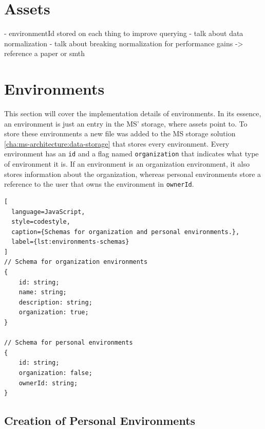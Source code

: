 %

\section{Assets}

- environmentId stored on each thing to improve querying
- talk about data normalization
- talk about breaking normalization for performance gains -> reference a paper or smth

\section{Environments}


This section will cover the implementation details of environments.
In its essence, an environment is just an entry in the MS' storage, where assets point to.
To store these environments a new file was added to the MS storage solution
\ref{cha:ms-architecture:data-storage} that stores every environment.
Every environment has an \lstinline{id} and a flag named \lstinline{organization} that
indicates what type of environment it is.
If an environment is an organization environment, it also stores information about the
organization,
whereas personal environments store a reference to the user that owns the environment in
\lstinline{ownerId}.

\begin{lstlisting}[
  language=JavaScript,
  style=codestyle,
  caption={Schemas for organization and personal environments.},
  label={lst:environments-schemas}
]
// Schema for organization environments
{
    id: string;
    name: string;
    description: string;
    organization: true;
}

// Schema for personal environments
{
    id: string;
    organization: false;
    ownerId: string;
}
\end{lstlisting}

\subsection{Creation of Personal Environments}

